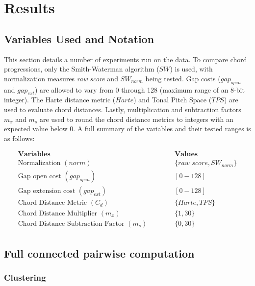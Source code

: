 \chapter{Results}

\section{Variables Used and Notation}

This section details a number of experiments run on the data. To compare chord progressions, only the Smith-Waterman algorithm ($SW$) is used, with normalization measures \textit{raw score} and ${SW}_{norm}$ being tested. Gap costs (${gap}_{open}$ and ${gap}_{ext}$) are allowed to vary from 0 through 128 (maximum range of an 8-bit integer). The Harte distance metric ($Harte$) and Tonal Pitch Space ($TPS$) are used to evaluate chord distances. Lastly, multiplication and subtraction factors $m_x$ and $m_s$ are used to round the chord distance metrics to integers with an expected value below 0. A full summary of the variables and their tested ranges is as follows:

\begin{align*}
\textbf{Variables}                       & \hspace{1cm} & \textbf{Values} \\
\text{Normalization } (norm)                    && \{\textit{raw score},{SW}_{norm}\} \\
\text{Gap open cost } ({gap}_{open})                    && [0-128] \\
\text{Gap extension cost } ({gap}_{ext})                && [0-128] \\
\text{Chord Distance Metric } (C_d)            && \{Harte, TPS\} \\
\text{Chord Distance Multiplier } (m_x)       && \{1, 30\} \\
\text{Chord Distance Subtraction Factor } (m_s) && \{0, 30\} \\
\end{align*}

\section{Full connected pairwise computation}

\subsection{Clustering}

